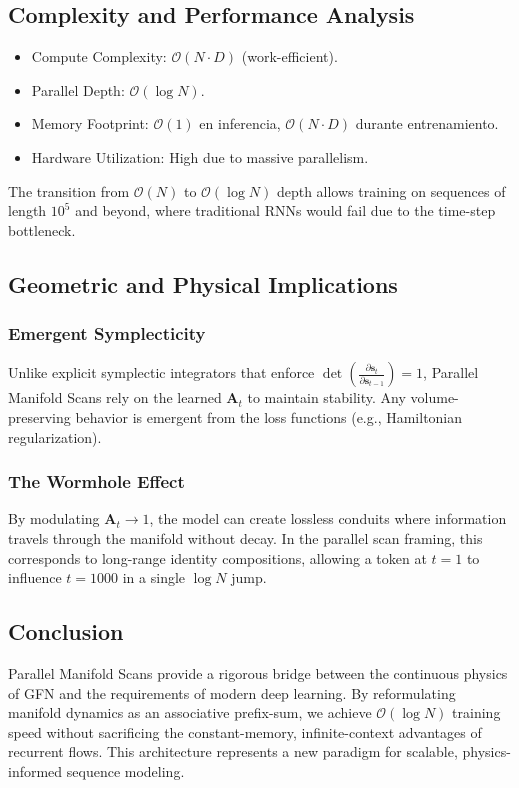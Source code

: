 \documentclass{article}
\numberwithin{equation}{section}
\begin{document}
\subsection{Complexity and Performance Analysis}
\begin{itemize}
\item Compute Complexity: $\mathcal{O}(N \cdot D)$ (work-efficient).
\item Parallel Depth: $\mathcal{O}(\log N)$.
\item Memory Footprint: $\mathcal{O}(1)$ en inferencia, $\mathcal{O}(N \cdot D)$ durante entrenamiento.
\item Hardware Utilization: High due to massive parallelism.
\end{itemize}
The transition from $\mathcal{O}(N)$ to $\mathcal{O}(\log N)$ depth allows training on sequences of length $10^5$ and beyond, where traditional RNNs would fail due to the time-step bottleneck.

\subsection{Geometric and Physical Implications}
\subsubsection{Emergent Symplecticity}
Unlike explicit symplectic integrators that enforce $\det\!\left(\frac{\partial \mathbf{s}_t}{\partial \mathbf{s}_{t-1}}\right) = 1$, Parallel Manifold Scans rely on the learned $\mathbf{A}_t$ to maintain stability. Any volume-preserving behavior is emergent from the loss functions (e.g., Hamiltonian regularization).

\subsubsection{The Wormhole Effect}
By modulating $\mathbf{A}_t \to 1$, the model can create lossless conduits where information travels through the manifold without decay. In the parallel scan framing, this corresponds to long-range identity compositions, allowing a token at $t=1$ to influence $t=1000$ in a single $\log N$ jump.

\subsection{Conclusion}
Parallel Manifold Scans provide a rigorous bridge between the continuous physics of GFN and the requirements of modern deep learning. By reformulating manifold dynamics as an associative prefix-sum, we achieve $\mathcal{O}(\log N)$ training speed without sacrificing the constant-memory, infinite-context advantages of recurrent flows. This architecture represents a new paradigm for scalable, physics-informed sequence modeling.
\end{document}
